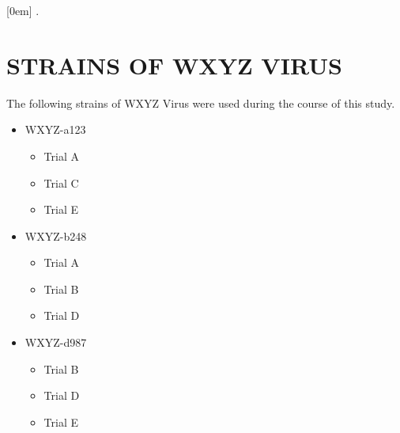 \appendix
\renewcommand{\chaptername}{APPENDIX}
    [0em]        %
    {\addvspace{0em} \normalfont} %
    {\hspace{1.5em}\thecontentslabel.\hspace{0.5em}}  %
    {\hspace*{-1em}}     %
    {\contentspage} %
\chapter{STRAINS OF WXYZ VIRUS}
The following strains of WXYZ Virus were used during the course of this study.

\begin{itemize}
\singlespacing
    \item WXYZ-a123
        \begin{itemize}
            \item Trial A
            \item Trial C
            \item Trial E
        \end{itemize}
    \item WXYZ-b248
         \begin{itemize}
            \item Trial A
            \item Trial B
            \item Trial D
        \end{itemize}
    \item WXYZ-d987
        \begin{itemize}
            \item Trial B
            \item Trial D
            \item Trial E
        \end{itemize}
\end{itemize}


